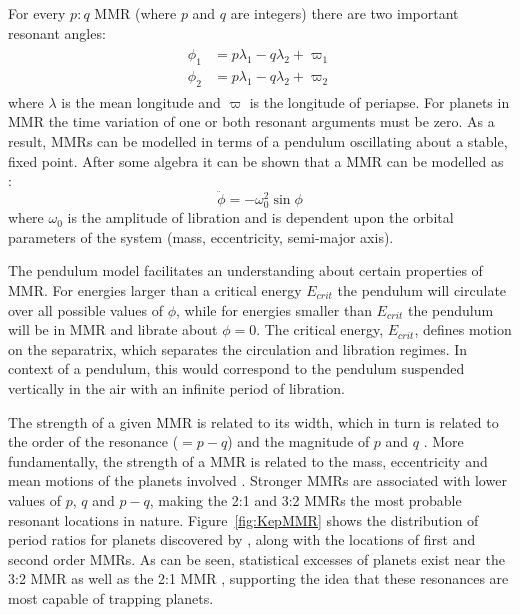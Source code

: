 For every $p:q$ MMR (where $p$ and $q$ are integers) there are two important resonant angles:
\begin{align}
\begin{split}
\phi_1 &= p\lambda_1 - q\lambda_2 + \varpi_1 \\
\phi_2 &= p\lambda_1 - q\lambda_2 + \varpi_2 
\label{eq:MMR}
\end{split}
\end{align}
where $\lambda$ is the mean longitude and $\varpi$ is the longitude of periapse. 
For planets in MMR the time variation of one or both resonant arguments must be zero.
As a result, MMRs can be modelled in terms of a pendulum oscillating about a stable, fixed point. 
After some algebra it can be shown that a MMR can be modelled as \citep{SSD1999}:
\begin{equation}
\ddot{\phi} = -\omega_0^2 \sin\phi
\label{eq:pendulum}
\end{equation}
where $\omega_0$ is the amplitude of libration and is dependent upon the orbital parameters of the system (mass, eccentricity, semi-major axis).

The pendulum model facilitates an understanding about certain properties of MMR. 
For energies larger than a critical energy $E_{crit}$ the pendulum will circulate over all possible values of $\phi$, while for energies smaller than $E_{crit}$ the pendulum will be in MMR and librate about $\phi = 0$.
The critical energy, $E_{crit}$, defines motion on the separatrix, which separates the circulation and libration regimes. 
In context of a pendulum, this would correspond to the pendulum suspended vertically in the air with an infinite period of libration. 

The strength of a given MMR is related to its width, which in turn is related to the order of the resonance ($= p - q$) and the magnitude of $p$ and $q$ \citep{SSD1999}. 
More fundamentally, the strength of a MMR is related to the mass, eccentricity and mean motions of the planets involved \citep{SSD1999}.
Stronger MMRs are associated with lower values of $p$, $q$ and $p-q$, making the 2:1 and 3:2 MMRs the most probable resonant locations in nature. 
Figure~\ref{fig:KepMMR} shows the distribution of period ratios for planets discovered by \kep, along with the locations of first and second order MMRs. 
As can be seen, statistical excesses of planets exist near the 3:2 MMR as well as the 2:1 MMR \citep{Lissauer2011,Fabrycky2014,Steffen2015}, supporting the idea that these resonances are most capable of trapping planets.


